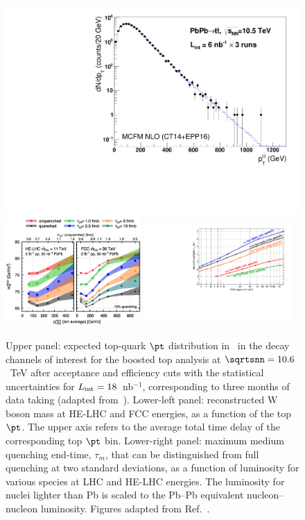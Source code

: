 \documentclass[../report.tex]{subfiles}
\begin{document}
\begin{figure}[!t]
\begin{center}
\includegraphics[width=0.49\columnwidth]{helhc/figs/dNdpT_reach_ttbar_HE_LHC.pdf}\\
\includegraphics[width=0.46\textwidth]{helhc/figs/WMass_tops.pdf}
\hfill
\includegraphics[width=0.5\textwidth]{helhc/figs/top_Time_vs_lumi_HE.pdf}
\caption{Upper panel: expected top-quark $\pt$ distribution in \PbPb\ in the
  decay channels of interest for the boosted top analysis at $\sqrtsnn=10.6$~TeV after acceptance and
  efficiency cuts with the statistical uncertainties
  for $L_{\rm int}=18$~nb$^{-1}$, corresponding to three months of data taking (adapted from~\cite{dEnterria:2015mgr}).
Lower-left panel: reconstructed W boson mass at HE-LHC and FCC
  energies, as a function of the top $\pt$. The upper axis refers to
  the average total time delay of the corresponding top $\pt$
  bin. Lower-right panel: maximum medium quenching
end-time, $\tau_m$, that can be distinguished from full quenching at
two standard deviations, as a function of luminosity for various species at LHC and HE-LHC energies.
The luminosity for nuclei lighter than Pb is scaled to the Pb--Pb equivalent nucleon--nucleon luminosity. 
Figures adapted from Ref.~\cite{Apolinario:2017sob}.}
\label{fig:tops}
\end{center}
\end{figure}
\end{document}
